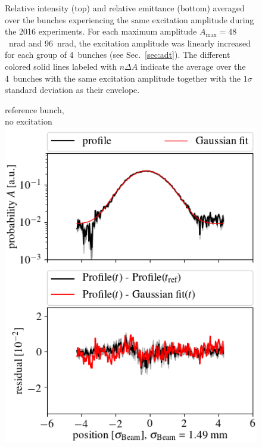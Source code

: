 \documentclass[%
 reprint,
 amsmath,amssymb,
 aps,
prstab,
]{revtex4-1}
\begin{document}
\begin{figure}[h]
\begin{minipage}[t]{0.49\linewidth}
	\end{minipage}	
	\caption{\label{fig:10thexp} Relative intensity (top) and relative emittance (bottom) averaged over the bunches experiencing the same excitation amplitude during the 2016 experiments. For each maximum amplitude $A_{\mathrm{max}}=48$~nrad and 96~nrad, the excitation amplitude was linearly increased for each group of 4~bunches (see Sec.~\ref{sec:adt}). The different colored solid lines labeled with $n\Delta A$ indicate the average over the 4~bunches with the same excitation amplitude together with the $1\sigma$ standard deviation as their envelope.}
\end{figure}
\begin{figure}[h]
	\begin{minipage}[t]{0.49\linewidth}
		\centering
		reference bunch,\\ no excitation
		\includegraphics[width=1.0\linewidth]{profile_v_10thv_slot_50.png}
	\end{minipage}
	\begin{minipage}[t]{0.49\linewidth}
		\centering

\end{minipage}
\end{figure}
\end{document}
